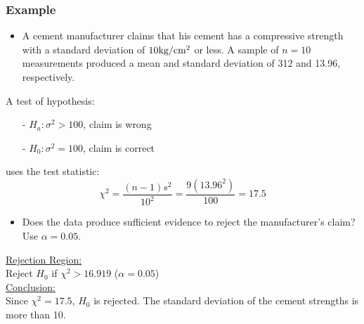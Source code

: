 \documentclass[12pt, letterpaper]{article}
\begin{document}
            \subsubsection*{Example}
                \begin{itemize}
                    \item A cement manufacturer claims that his cement has a compressive strength with a standard deviation of $10\textnormal{kg}/\textnormal{cm}^2$ or less. A sample of $n = 10$ measurements produced a mean and standard deviation of 312 and 13.96, respectively.
                \end{itemize}
                \begin{mdframed}[leftmargin=0.5cm, rightmargin=0.5cm]
                    A test of hypothesis:
                    \begin{itemize}
                        \item[-] $H_a: \sigma^2 > 100$, claim is wrong
                        \item[-] $H_0: \sigma^2 = 100$, claim is correct
                    \end{itemize}
                    uses the test statistic:
                    \begin{equation*}
                        \chi^2 = \frac{(n-1)s^2}{10^2} = \frac{9(13.96^2)}{100} = 17.5
                    \end{equation*}
                \end{mdframed}
                \begin{itemize}
                    \item Does the data produce sufficient evidence to reject the manufacturer's claim? Use $\alpha = 0.05$.
                \end{itemize}
                \begin{mdframed}[leftmargin=0.5cm, rightmargin=0.5]
                   \underline{Rejection Region:} \\
                   Reject $H_0$ if $\chi^2 > 16.919$ ($\alpha = 0.05$) \\
                   \underline{Conclusion:} \\
                   Since $\chi^2 = 17.5$, $H_0$ is rejected. The standard deviation of the cement strengths is more than 10. 
                \end{mdframed}
\end{document}
